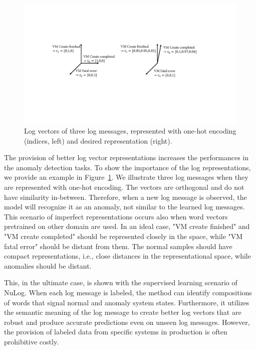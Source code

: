 \begin{figure}[!b]
\centerline{\includegraphics[width=1.0\textwidth]{gfx/chap5/orthogonallogvectors.pdf}}
\caption{Log vectors of three log messages, represented with one-hot encoding (indices, left) and desired representation (right).}
\label{fig:logrepresentations}
\end{figure}

The provision of better log vector representations increases the performances in the anomaly detection tasks. To show the importance of the log representations, we provide an example in Figure~\ref{fig:logrepresentations}. We illustrate three log messages when they are represented with one-hot encoding. The vectors are orthogonal and do not have similarity in-between. Therefore, when a new log message is observed, the model will recognize it as an anomaly, not similar to the learned log messages. This scenario of imperfect representations occurs also when word vectors pretrained on other domain are used. In an ideal case, "VM create finished" and "VM create completed" should be represented closely in the space, while "VM fatal error" should be distant from them. The normal samples should have compact representations, i.e., close distances in the representational space, while anomalies should be distant.

This, in the ultimate case, is shown with the supervised learning scenario of NuLog. When each log message is labeled, the method can identify compositions of words that signal normal and anomaly system states. Furthermore, it utilizes the semantic meaning of the log message to create better log vectors that are robust and produce accurate predictions even on unseen log messages. However, the provision of labeled data from specific systems in production is often prohibitive costly.


